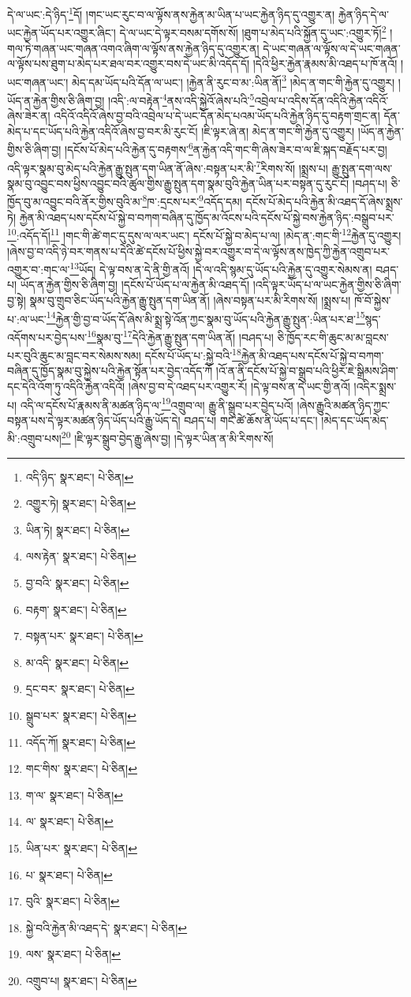 དེ་ལ་ཡང་:དེ་ཉིད་\footnote{འདི་ཉིད་  སྣར་ཐང་།  པེ་ཅིན། }དོ། །གང་ཡང་རུང་བ་ལ་ལྟོས་ནས་རྐྱེན་མ་ཡིན་པ་ཡང་རྐྱེན་ཉིད་དུ་འགྱུར་ན། རྐྱེན་ཉིད་དེ་ལ་ཡང་རྐྱེན་ཡོད་པར་འགྱུར་ཞིང་། དེ་ལ་ཡང་དེ་ལྟར་བསམ་དགོས་སོ། །ཐུག་པ་མེད་པའི་སྐྱོན་དུ་ཡང་:འགྱུར་ཏོ།\footnote{འགྱུར་ཏེ།  སྣར་ཐང་།  པེ་ཅིན། } །གལ་ཏེ་གཞན་ཡང་གཞན་འགའ་ཞིག་ལ་ལྟོས་ནས་རྐྱེན་ཉིད་དུ་འགྱུར་ན། དེ་ཡང་གཞན་ལ་ལྟོས་ལ་དེ་ཡང་གཞན་ལ་ལྟོས་པས་ཐུག་པ་མེད་པར་ཐལ་བར་འགྱུར་བས་དེ་ཡང་མི་འདོད་དོ། །དེའི་ཕྱིར་རྐྱེན་རྣམས་མི་འཐད་པ་ཁོ་ནའོ། །ཡང་གཞན་ཡང་། མེད་དམ་ཡོད་པའི་དོན་ལ་ཡང་། །རྐྱེན་ནི་རུང་བ་མ་:ཡིན་ནོ།\footnote{ཡིན་ཏེ།  སྣར་ཐང་།  པེ་ཅིན། } །མེད་ན་གང་གི་རྐྱེན་དུ་འགྱུར། །ཡོད་ན་རྐྱེན་གྱིས་ཅི་ཞིག་བྱ། །འདི་:ལ་བརྟེན་\footnote{ལས་རྟེན་  སྣར་ཐང་།  པེ་ཅིན། }ནས་འདི་སྐྱེའོ་ཞེས་པའི་\footnote{བྱ་བའི་  སྣར་ཐང་།  པེ་ཅིན། }འབྲེལ་པ་འདིས་དོན་འདིའི་རྐྱེན་འདིའོ་ཞེས་ཟེར་ན། འདིའོ་འདིའོ་ཞེས་བྱ་བའི་འབྲེལ་པ་དེ་ཡང་དོན་མེད་པའམ་ཡོད་པའི་རྐྱེན་ཉིད་དུ་བརྟག་གྲང་ན། དོན་མེད་པ་དང་ཡོད་པའི་རྐྱེན་འདིའོ་ཞེས་བྱ་བར་མི་རུང་ངོ། །ཇི་ལྟར་ཞེ་ན། མེད་ན་གང་གི་རྐྱེན་དུ་འགྱུར། །ཡོད་ན་རྐྱེན་གྱིས་ཅི་ཞིག་བྱ། །དངོས་པོ་མེད་པའི་རྐྱེན་དུ་བརྟགས་\footnote{བརྟག་  སྣར་ཐང་།  པེ་ཅིན། }ན་རྐྱེན་འདི་གང་གི་ཞེས་ཟེར་བ་ལ་ཇི་སྐད་བརྗོད་པར་བྱ། འདི་ལྟར་སྣམ་བུ་མེད་པའི་རྐྱེན་རྒྱུ་སྤུན་དག་ཡིན་ནོ་ཞེས་:བསྟན་པར་མི་\footnote{བསྟན་པར་  སྣར་ཐང་།  པེ་ཅིན། }རིགས་སོ། །སྨྲས་པ། རྒྱུ་སྤུན་དག་ལས་སྣམ་བུ་འབྱུང་བས་ཕྱིས་འབྱུང་བའི་ཚུལ་གྱིས་རྒྱུ་སྤུན་དག་སྣམ་བུའི་རྐྱེན་ཡིན་པར་བསྟན་དུ་རུང་ངོ། །བཤད་པ། ཅི་ཁྱོད་བུ་མ་འབྱུང་བའི་ནོར་གྱིས་བུའི་མ་\footnote{མ་འདི་  སྣར་ཐང་།  པེ་ཅིན། }ཁ་:དྲངས་པར་\footnote{དྲང་བར་  སྣར་ཐང་།  པེ་ཅིན། }འདོད་དམ། དངོས་པོ་མེད་པའི་རྐྱེན་མི་འཐད་དོ་ཞེས་སྨྲས་ཏེ། རྐྱེན་མི་འཐད་པས་དངོས་པོ་སྐྱེ་བ་བཀག་བཞིན་དུ་ཁྱོད་མ་འོངས་པའི་དངོས་པོ་སྐྱེ་བས་རྐྱེན་ཉིད་:བསྒྲུབ་པར་\footnote{སྒྲུབ་པར་  སྣར་ཐང་།  པེ་ཅིན། }:འདོད་དོ།\footnote{འདོད་ཀོ།  སྣར་ཐང་།  པེ་ཅིན། } །གང་གི་ཚེ་གང་དུ་དུས་ལ་ལར་ཡང་། དངོས་པོ་སྐྱེ་བ་མེད་པ་ལ། །མེད་ན་:གང་གི་\footnote{གང་གིས་  སྣར་ཐང་།  པེ་ཅིན། }རྐྱེན་དུ་འགྱུར། །ཞེས་བྱ་བ་འདི་ཉེ་བར་གནས་པ་དེའི་ཚེ་དངོས་པོ་ཕྱིས་སྐྱེ་བར་འགྱུར་བ་དེ་ལ་ལྟོས་ནས་ཁྱེད་ཀྱི་རྐྱེན་འགྲུབ་པར་འགྱུར་བ་:གང་ལ་\footnote{ག་ལ་  སྣར་ཐང་།  པེ་ཅིན། }ཡོད། དེ་ལྟ་བས་ན་དེ་ནི་གྱི་ནའོ། །དེ་ལ་འདི་སྙམ་དུ་ཡོད་པའི་རྐྱེན་དུ་འགྱུར་སེམས་ན། བཤད་པ། ཡོད་ན་རྐྱེན་གྱིས་ཅི་ཞིག་བྱ། །དངོས་པོ་ཡོད་པ་ལ་རྐྱེན་མི་འཐད་དོ། །འདི་ལྟར་ཡོད་པ་ལ་ཡང་རྐྱེན་གྱིས་ཅི་ཞིག་བྱ་སྟེ། སྣམ་བུ་གྲུབ་ཅིང་ཡོད་པའི་རྐྱེན་རྒྱུ་སྤུན་དག་ཡིན་ནོ། །ཞེས་བསྟན་པར་མི་རིགས་སོ། །སྨྲས་པ། ཁོ་བོ་སྐྱེས་པ་:ལ་ཡང་\footnote{ལ་  སྣར་ཐང་།  པེ་ཅིན། }རྐྱེན་གྱི་བྱ་བ་ཡོད་དོ་ཞེས་མི་སྨྲ་སྟེ་འོན་ཀྱང་སྣམ་བུ་ཡོད་པའི་རྐྱེན་རྒྱུ་སྤུན་:ཡིན་པར་ཐ་\footnote{ཡིན་པར་  སྣར་ཐང་།  པེ་ཅིན། }སྙད་འདོགས་པར་བྱེད་པས་\footnote{པ་  སྣར་ཐང་།  པེ་ཅིན། }སྣམ་བུ་\footnote{བུའི་  སྣར་ཐང་།  པེ་ཅིན། }དེའི་རྐྱེན་རྒྱུ་སྤུན་དག་ཡིན་ནོ། །བཤད་པ། ཅི་ཁྱོད་རང་གི་ཆུང་མ་མ་བླངས་པར་བུའི་ཆུང་མ་བླང་བར་སེམས་སམ། དངོས་པོ་ཡོད་པ་:སྐྱེ་བའི་\footnote{སྐྱེ་བའི་རྐྱེན་མི་འཐད་དེ་  སྣར་ཐང་།  པེ་ཅིན། }རྐྱེན་མི་འཐད་པས་དངོས་པོ་སྐྱེ་བ་བཀག་བཞིན་དུ་ཁྱོད་སྣམ་བུ་སྐྱེས་པའི་རྐྱེན་སྟོན་པར་བྱེད་འདོད་ཀོ །འོ་ན་ནི་དངོས་པོ་སྐྱེ་བ་སྒྲུབ་པའི་ཕྱིར་ཇེ་སྒྲིམས་ཤིག་དང་དེའི་འོག་ཏུ་འདིའི་རྐྱེན་འདིའོ། །ཞེས་བྱ་བ་དེ་འཐད་པར་འགྱུར་རོ། །དེ་ལྟ་བས་ན་དེ་ཡང་གྱི་ནའོ། །འདིར་སྨྲས་པ། འདི་ལ་དངོས་པོ་རྣམས་ནི་མཚན་ཉིད་ལ་\footnote{ལས་  སྣར་ཐང་།  པེ་ཅིན། }འགྲུབ་ལ། རྒྱུ་ནི་སྒྲུབ་པར་བྱེད་པའོ། །ཞེས་རྒྱུའི་མཚན་ཉིད་ཀྱང་བསྟན་པས་དེ་ལྟར་མཚན་ཉིད་ཡོད་པའི་རྒྱུ་ཡོད་དེ། བཤད་པ། གང་ཚེ་ཆོས་ནི་ཡོད་པ་དང་། །མེད་དང་ཡོད་མེད་མི་:འགྲུབ་པས།\footnote{འགྲུབ་པ།  སྣར་ཐང་།  པེ་ཅིན། } །ཇི་ལྟར་སྒྲུབ་བྱེད་རྒྱུ་ཞེས་བྱ། །དེ་ལྟར་ཡིན་ན་མི་རིགས་སོ། 